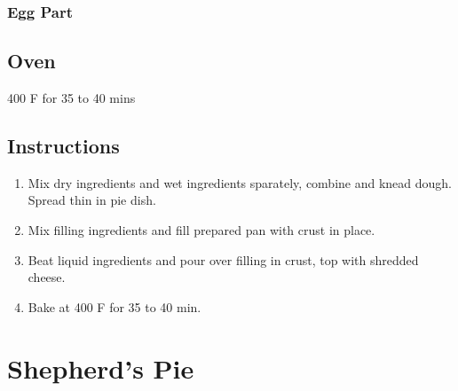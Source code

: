 \documentclass[ansiapaper,10pt,english]{sphinxmanual}
\begin{document}
\subsection{Egg Part}
\label{\detokenize{Quiche:egg-part}}
%
\begin{sphinxVerbatim}[commandchars=\\\{\}]
  

  

 
\end{sphinxVerbatim}


\section{Oven}
\label{\detokenize{Quiche:oven}}
400 F for 35 to 40 mins


\section{Instructions}
\label{\detokenize{Quiche:instructions}}\begin{enumerate}
\item {} 
Mix dry ingredients and wet ingredients sparately, combine and knead dough. Spread thin in pie dish.

\item {} 
Mix filling ingredients and fill prepared pan with crust in place.

\item {} 
Beat liquid ingredients and pour over filling in crust, top with shredded cheese.

\item {} 
Bake at 400 F for 35 to 40 min.

\end{enumerate}


\chapter{Shepherd’s Pie}
\label{\detokenize{Shep_Pie:shepherd-s-pie}}\label{\detokenize{Shep_Pie::doc}}
\end{document}
